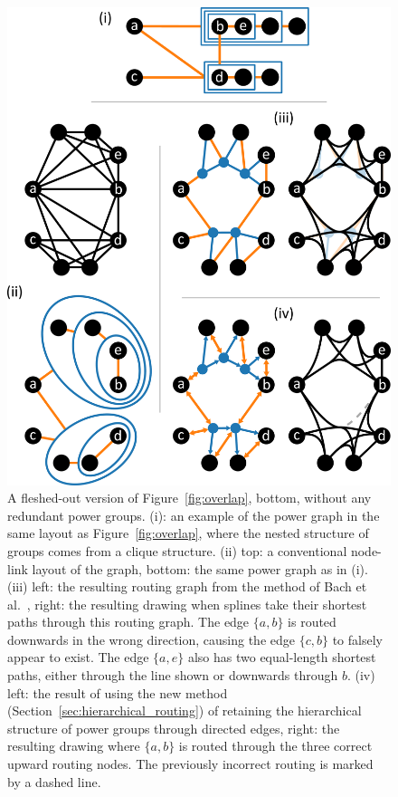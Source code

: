 \begin{figure}
  \centering
  \includegraphics[width=.8\linewidth]{power/shortcircuit_big.pdf}
  \caption[A full version of Figure~\ref{fig:overlap}]{A fleshed-out version of Figure~\ref{fig:overlap}, bottom, without any redundant power groups.
  (i): an example of the power graph in the same layout as Figure~\ref{fig:overlap}, where the nested structure of groups comes from a clique structure.
  (ii) top: a conventional node-link layout of the graph, bottom: the same power graph as in (i). 
  (iii) left: the resulting routing graph from the method of Bach et al.\ \cite{Bach2017}, right: the resulting drawing when splines take their shortest paths through this routing graph. The edge $\{a,b\}$ is routed downwards in the wrong direction, causing the edge $\{c,b\}$ to falsely appear to exist.
  The edge $\{a,e\}$ also has two equal-length shortest paths, either through the line shown or downwards through $b$.
  (iv) left: the result of using the new method (Section~\ref{sec:hierarchical_routing}) of retaining the hierarchical structure of power groups through directed edges, right: the resulting drawing where $\{a,b\}$ is routed through the three correct upward routing nodes. The previously incorrect routing is marked by a dashed line.
  }
  \label{fig:overlap_sm}
\end{figure}

